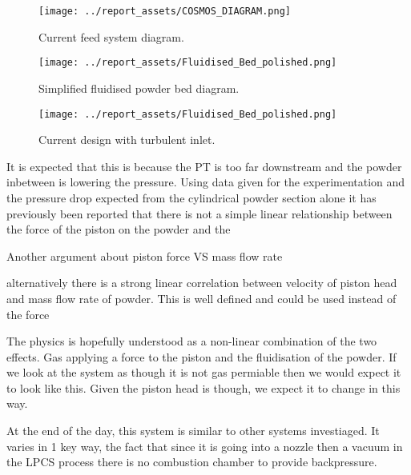 \begin{figure}[htbp]
    \centering

    \begin{minipage}{0.3\textwidth}
        \centering
        \texttt{[image: ../report\_assets/COSMOS\_DIAGRAM.png]}
        \caption{Current feed system diagram.}\label{fig:idkyet1}
    \end{minipage}
    \hfill
    \begin{minipage}{0.3\textwidth}
        \centering
        \texttt{[image: ../report\_assets/Fluidised\_Bed\_polished.png]}
        \caption{Simplified fluidised powder bed diagram.}\label{fig:idkyet2}
    \end{minipage}
    \hfill
    \begin{minipage}{0.3\textwidth}
        \centering
        \texttt{[image: ../report\_assets/Fluidised\_Bed\_polished.png]}
        \caption{Current design with turbulent inlet.}\label{fig:idkyet3}
    \end{minipage}

\end{figure}
It is expected that this is because the PT is too far downstream and the powder inbetween is lowering the pressure. Using data given for the experimentation and the pressure drop expected from the cylindrical powder section alone
it has previously been reported that there is not a simple linear relationship between the force of the piston on the powder and the 


Another argument about piston force VS mass flow rate

alternatively there is a strong linear correlation between velocity of piston head and mass flow rate of powder. This is well defined and could be used instead of the force


The physics is hopefully understood as a non-linear combination of the two effects. Gas applying a force to the piston and the fluidisation of the powder. If we look at the system as though it is not gas permiable then we would expect it to look like this. Given the piston head is though, we expect it to change in this way.

At the end of the day, this system is similar to other systems investiaged. It varies in 1 key way, the fact that since it is going into a nozzle then a vacuum in the LPCS process there is no combustion chamber to provide backpressure.
\newpage

